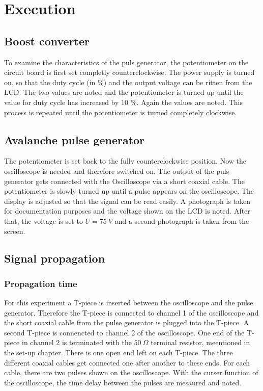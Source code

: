 \chapter{Execution}
\section{Boost converter}
To examine the characteristics of the puls generator, the potentiometer on the circuit board is first set completly
counterclockwise. The power supply is turned on, so that the duty cycle (in \%) and the output voltage can be ritten from
the LCD. The two values are noted and the potentiometer is turned up until the value for duty cycle has increased by 10 \%.
Again the values are noted. This process is repeated until the potentiometer is turned completely clockwise.
%
\section{Avalanche pulse generator}
The potentiometer is set back to the fully counterclockwise position. Now the oscilloscope is needed and therefore
switched on. The output of the puls generator gets connected with the Oscilloscope via a short coaxial cable. The
potentiometer is slowly turned up until a pulse appears on the oscilloscope. The display is adjusted so that the signal
can be read easily. A photograph is taken for documentation purposes and the voltage shown on the LCD is noted. After
that, the voltage is set to \(U = \SI[]{75}[]{V}\) and a second photograph is taken from the screen.
%
\section{Signal propagation}
\subsection{Propagation time}
For this experiment a T-piece is inserted between the oscilloscope and the pulse generator. Therefore the T-piece is
connected to channel 1 of the oscilloscope and the short coaxial cable from the pulse generator is plugged into the
T-piece. A second T-piece is connencted to channel 2 of the oscilloscope. One end of the T-piece in channel 2 is terminated
with the $50\ \Omega$ terminal resistor, meentioned in the set-up chapter. There is one open end left on each T-piece.
The three different coaxial cables get connected one after another to these ends. For each cable, there are two pulses
shown on the oscilloscope. With the curser function of the oscilloscope, the time delay between the pulses are mesaured
and noted.
%
